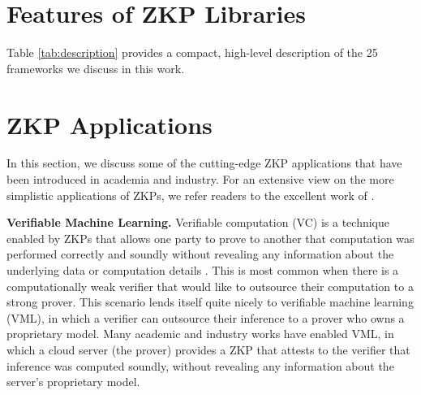 \section{Features of ZKP Libraries}
\label{sec:app_libraries}
Table \ref{tab:description} provides a compact, high-level description of the 25 frameworks we discuss in this work.




\section{ZKP Applications}
\label{sec:applications}
In this section, we discuss some of the cutting-edge ZKP applications that have been introduced in academia and industry. For an extensive view on the more simplistic applications of ZKPs, we refer readers to the excellent work of \cite{Chainlink2023ZeroKnowledgeProof}. 

\textbf{Verifiable Machine Learning. }
Verifiable computation (VC) is a technique enabled by ZKPs that allows one party to prove to another that computation was performed correctly and soundly without revealing any information about the underlying data or computation details \cite{vsimunic2021verifiable}. This is most common when there is a computationally weak verifier that would like to outsource their computation to a strong prover. This scenario lends itself quite nicely to verifiable machine learning (VML), in which a verifier can outsource their inference to a prover who owns a proprietary model. Many academic \cite{weng2021mystique, liu2021zkcnn, lee2020vcnn, feng2021zen} and industry \cite{ZkonduitInc2023EZKL} works have enabled VML, in which a cloud server (the prover) provides a ZKP that attests to the verifier that inference was computed soundly, without revealing any information about the server's proprietary model.

